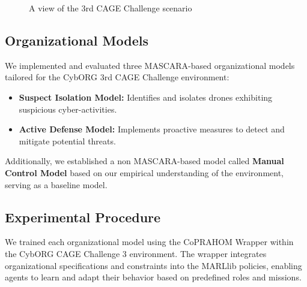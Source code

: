 \documentclass[conference]{IEEEtran}
\begin{document}
\begin{figure}
    
    \caption{A view of the 3rd CAGE Challenge scenario}\label{fig:cage_illustration}
\end{figure}

\subsection{Organizational Models}

We implemented and evaluated three MASCARA-based organizational models tailored for the CybORG 3rd CAGE Challenge environment:

\begin{itemize}
    \item \textbf{Suspect Isolation Model:} Identifies and isolates drones exhibiting suspicious cyber-activities.
    \item \textbf{Active Defense Model:} Implements proactive measures to detect and mitigate potential threats.
\end{itemize}

Additionally, we established a non MASCARA-based model called \textbf{Manual Control Model} based on our empirical understanding of the environment, serving as a baseline model.

\subsection{Experimental Procedure}

We trained each organizational model using the CoPRAHOM Wrapper within the CybORG CAGE Challenge 3 environment. The wrapper integrates organizational specifications and constraints into the MARLlib policies, enabling agents to learn and adapt their behavior based on predefined roles and missions.
\end{document}
